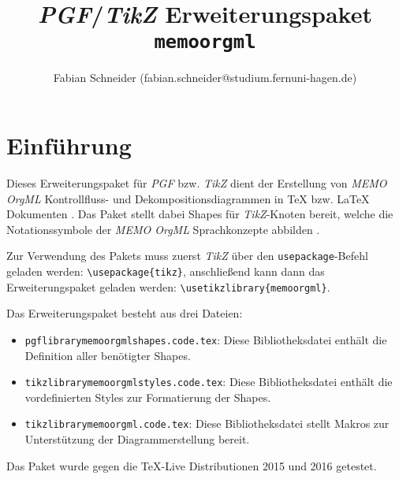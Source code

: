 \documentclass[12pt, a4paper]{article}
\begin{document}
\begin{titlepage}
\title{\textit{PGF}/\textit{TikZ} Erweiterungspaket \texttt{memoorgml}} 
\author{Fabian Schneider (fabian.schneider@studium.fernuni-hagen.de)}
\bigskip
\bigskip  
\end{titlepage}
\maketitle

\begin{figure}[htbp]
\end{figure}

\section{Einführung}
\label{sec:Einfuehrung}
Dieses Erweiterungspaket für \textit{PGF} bzw. \textit{TikZ} dient der Erstellung von \textit{MEMO OrgML} Kontrollfluss- und
Dekompositionsdiagrammen in \TeX{} bzw. \LaTeX{} Dokumenten \cite{Frank:MEMOOrgML2}.\newline
Das Paket stellt dabei Shapes für \textit{TikZ}-Knoten bereit, welche die Notationssymbole der \textit{MEMO OrgML} Sprachkonzepte abbilden \cite{Tantau:Tikz}.\medskip

\noindent Zur Verwendung des Pakets muss zuerst \textit{TikZ} über den \texttt{usepackage}-Befehl geladen werden: \lstinline|\usepackage{tikz}|, anschließend kann dann das Erweiterungspaket geladen werden: \lstinline|\usetikzlibrary{memoorgml}|.\medskip

\noindent Das Erweiterungspaket besteht aus drei Dateien:
\begin{itemize}
    \item {\texttt{pgflibrarymemoorgmlshapes.code.tex}: Diese Bibliotheksdatei enthält die Definition aller benötigter Shapes.}
    \item {\texttt{tikzlibrarymemoorgmlstyles.code.tex}: Diese Bibliotheksdatei enthält die vordefinierten Styles zur Formatierung der Shapes.}
    \item {\texttt{tikzlibrarymemoorgml.code.tex}: Diese Bibliotheksdatei stellt Makros zur Unterstützung der Diagrammerstellung bereit.}
\end{itemize}
\noindent Das Paket wurde gegen die \TeX-Live Distributionen 2015 und 2016 getestet.\medskip
\newpage
\end{document}
